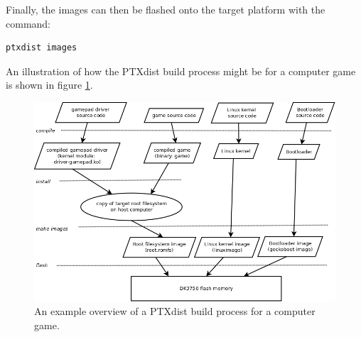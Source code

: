 Finally, the images can then be flashed onto the target platform with the command:
\lstset{style=lststyle-terminal}
\begin{lstlisting}
ptxdist images
\end{lstlisting}
An illustration of how the PTXdist build process might be for a computer game is shown in figure \ref{fig:ptxdist-build-process}.

\begin{figure}[ht]\label{fig:ptxdist-build-process}
  \includegraphics[width=\textwidth]{images/ptxdist_build_process.png}
  \caption{An example overview of a PTXdist build process for a computer game.}
\end{figure}

